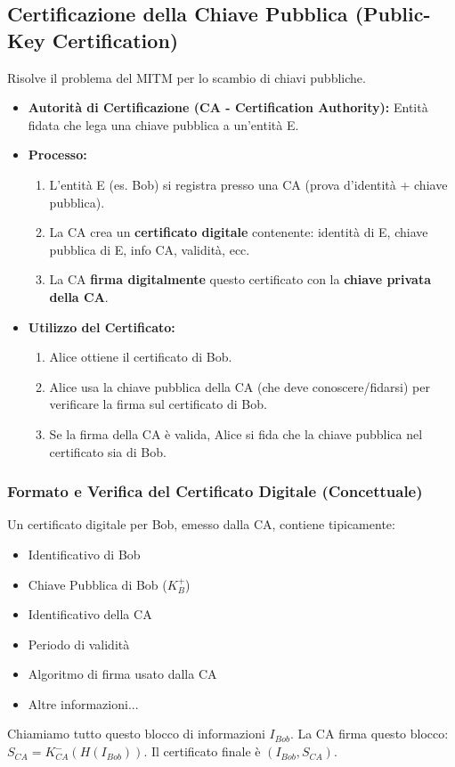 \subsection{Certificazione della Chiave Pubblica (Public-Key Certification)}
Risolve il problema del MITM per lo scambio di chiavi pubbliche.
\begin{itemize}
    \item \textbf{Autorità di Certificazione (CA - Certification Authority):} Entità fidata che lega una chiave pubblica a un'entità E.
    \item \textbf{Processo:}
    \begin{enumerate}
        \item L'entità E (es. Bob) si registra presso una CA (prova d'identità + chiave pubblica).
        \item La CA crea un \textbf{certificato digitale} contenente: identità di E, chiave pubblica di E, info CA, validità, ecc.
        \item La CA \textbf{firma digitalmente} questo certificato con la \textbf{chiave privata della CA}.
    \end{enumerate}
    \item \textbf{Utilizzo del Certificato:}
    \begin{enumerate}
        \item Alice ottiene il certificato di Bob.
        \item Alice usa la chiave pubblica della CA (che deve conoscere/fidarsi) per verificare la firma sul certificato di Bob.
        \item Se la firma della CA è valida, Alice si fida che la chiave pubblica nel certificato sia di Bob.
    \end{enumerate}
\end{itemize}

\subsubsection{Formato e Verifica del Certificato Digitale (Concettuale)}
\label{ssubsec:certificato_digitale_formato}
Un certificato digitale per Bob, emesso dalla CA, contiene tipicamente:
\begin{itemize}
    \item Identificativo di Bob
    \item Chiave Pubblica di Bob ($K_B^+$)
    \item Identificativo della CA
    \item Periodo di validità
    \item Algoritmo di firma usato dalla CA
    \item Altre informazioni...
\end{itemize}
Chiamiamo tutto questo blocco di informazioni $I_{Bob}$.
La CA firma questo blocco: $S_{CA} = K_{CA}^-(H(I_{Bob}))$.
Il certificato finale è $(I_{Bob}, S_{CA})$.

